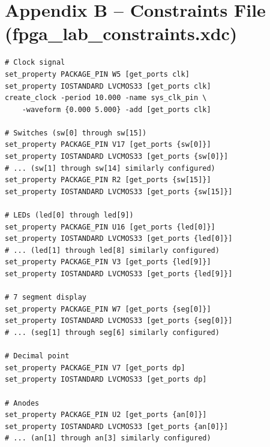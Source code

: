 \documentclass[12pt,a4paper]{article}
\begin{document}
\section*{Appendix B -- Constraints File (fpga\_lab\_constraints.xdc)}
\begin{lstlisting}[style=xdc]
# Clock signal
set_property PACKAGE_PIN W5 [get_ports clk]
set_property IOSTANDARD LVCMOS33 [get_ports clk]
create_clock -period 10.000 -name sys_clk_pin \
    -waveform {0.000 5.000} -add [get_ports clk]

# Switches (sw[0] through sw[15])
set_property PACKAGE_PIN V17 [get_ports {sw[0]}]
set_property IOSTANDARD LVCMOS33 [get_ports {sw[0]}]
# ... (sw[1] through sw[14] similarly configured)
set_property PACKAGE_PIN R2 [get_ports {sw[15]}]
set_property IOSTANDARD LVCMOS33 [get_ports {sw[15]}]

# LEDs (led[0] through led[9])
set_property PACKAGE_PIN U16 [get_ports {led[0]}]
set_property IOSTANDARD LVCMOS33 [get_ports {led[0]}]
# ... (led[1] through led[8] similarly configured)
set_property PACKAGE_PIN V3 [get_ports {led[9]}]
set_property IOSTANDARD LVCMOS33 [get_ports {led[9]}]

# 7 segment display
set_property PACKAGE_PIN W7 [get_ports {seg[0]}]
set_property IOSTANDARD LVCMOS33 [get_ports {seg[0]}]
# ... (seg[1] through seg[6] similarly configured)

# Decimal point
set_property PACKAGE_PIN V7 [get_ports dp]
set_property IOSTANDARD LVCMOS33 [get_ports dp]

# Anodes
set_property PACKAGE_PIN U2 [get_ports {an[0]}]
set_property IOSTANDARD LVCMOS33 [get_ports {an[0]}]
# ... (an[1] through an[3] similarly configured)
\end{lstlisting}
\end{document}
